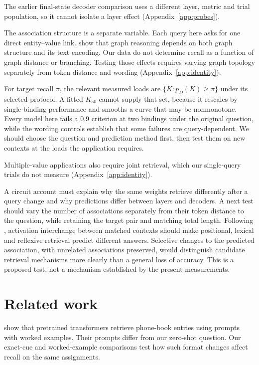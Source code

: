 \documentclass{article}
\begin{document}
The earlier final-state decoder comparison uses a different layer, metric and trial population, so it cannot isolate a layer effect (Appendix~\ref{app:probes}).

The association structure is a separate variable.
Each query here asks for one direct entity--value link.
\citet{fatemi2024} show that graph reasoning depends on both graph structure and its text encoding.
Our data do not determine recall as a function of graph distance or branching.
Testing those effects requires varying graph topology separately from token distance and wording (Appendix~\ref{app:identity}).

For target recall $\pi$, the relevant measured loads are $\{K:p_D(K)\geq\pi\}$ under its selected protocol.
A fitted $K_{50}$ cannot supply that set, because it rescales by single-binding performance and smooths a curve that may be nonmonotone.
Every model here fails a 0.9 criterion at two bindings under the original question, while the wording controls establish that some failures are query-dependent.
We should choose the question and prediction method first, then test them on new contexts at the loads the application requires.

Multiple-value applications also require joint retrieval, which our single-query trials do not measure (Appendix~\ref{app:identity}).

A circuit account must explain why the same weights retrieve differently after a query change and why predictions differ between layers and decoders.
A next test should vary the number of associations separately from their token distance to the question, while retaining the target pair and matching total length.
Following \citet{mixing2510}, activation interchange between matched contexts should make positional, lexical and reflexive retrieval predict different answers.
Selective changes to the predicted association, with unrelated associations preserved, would distinguish candidate retrieval mechanisms more clearly than a general loss of accuracy.
This is a proposed test, not a mechanism established by the present measurements.

\section{Related work}\label{sec:related}
\citet{jelassi2024} show that pretrained transformers retrieve phone-book entries using prompts with worked examples.
Their prompts differ from our zero-shot question.
Our exact-cue and worked-example comparisons test how such format changes affect recall on the same assignments.
\end{document}
